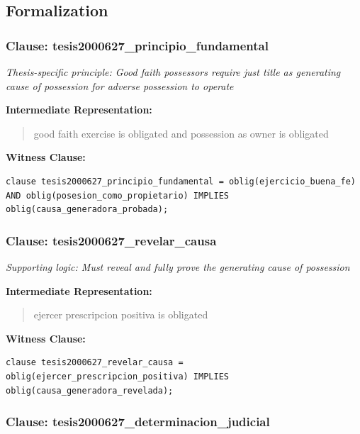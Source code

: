 \documentclass[11pt,a4paper]{article}
\begin{document}
\subsection{Formalization}

\subsubsection{Clause: tesis2000627\_principio\_fundamental}

\textit{Thesis-specific principle: Good faith possessors require just title as generating cause of possession for adverse possession to operate}

\textbf{Intermediate Representation:}

\begin{quote}
good faith exercise is obligated and possession as owner is obligated
\end{quote}

\textbf{Witness Clause:}

\begin{lstlisting}[style=witnessstyle, language=Witness]
clause tesis2000627_principio_fundamental = oblig(ejercicio_buena_fe) AND oblig(posesion_como_propietario) IMPLIES oblig(causa_generadora_probada);
\end{lstlisting}

\subsubsection{Clause: tesis2000627\_revelar\_causa}

\textit{Supporting logic: Must reveal and fully prove the generating cause of possession}

\textbf{Intermediate Representation:}

\begin{quote}
ejercer prescripcion positiva is obligated
\end{quote}

\textbf{Witness Clause:}

\begin{lstlisting}[style=witnessstyle, language=Witness]
clause tesis2000627_revelar_causa = oblig(ejercer_prescripcion_positiva) IMPLIES oblig(causa_generadora_revelada);
\end{lstlisting}

\subsubsection{Clause: tesis2000627\_determinacion\_judicial}
\end{document}
